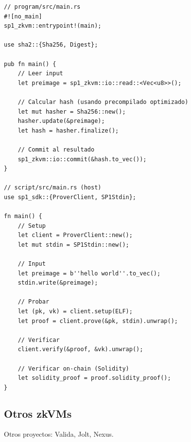 \documentclass[11pt,a4paper,twoside]{book}
\begin{document}
\begin{example}[Programa SP1]
\begin{lstlisting}[style=rust]
// program/src/main.rs
#![no_main]
sp1_zkvm::entrypoint!(main);

use sha2::{Sha256, Digest};

pub fn main() {
    // Leer input
    let preimage = sp1_zkvm::io::read::<Vec<u8>>();
    
    // Calcular hash (usando precompilado optimizado)
    let mut hasher = Sha256::new();
    hasher.update(&preimage);
    let hash = hasher.finalize();
    
    // Commit al resultado
    sp1_zkvm::io::commit(&hash.to_vec());
}

// script/src/main.rs (host)
use sp1_sdk::{ProverClient, SP1Stdin};

fn main() {
    // Setup
    let client = ProverClient::new();
    let mut stdin = SP1Stdin::new();
    
    // Input
    let preimage = b''hello world''.to_vec();
    stdin.write(&preimage);
    
    // Probar
    let (pk, vk) = client.setup(ELF);
    let proof = client.prove(&pk, stdin).unwrap();
    
    // Verificar
    client.verify(&proof, &vk).unwrap();
    
    // Verificar on-chain (Solidity)
    let solidity_proof = proof.solidity_proof();
}
\end{lstlisting}
\end{example}

\subsection{Otros zkVMs}

Otros proyectos: Valida, Jolt, Nexus.
\end{document}
